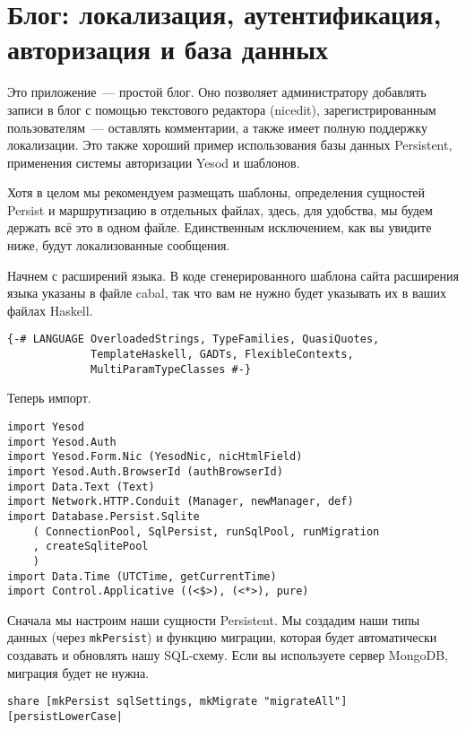 ﻿\chapter{Блог: локализация, аутентификация, авторизация и база данных}
\label{chap:blog}

Это приложение~--- простой блог. Оно позволяет администратору добавлять записи в блог с помощью текстового редактора (nicedit), зарегистрированным пользователям~--- оставлять комментарии, а также имеет полную поддержку локализации. Это также хороший пример использования базы данных Persistent, применения системы авторизации Yesod и шаблонов.

Хотя в целом мы рекомендуем размещать шаблоны, определения сущностей Persist и маршрутизацию в отдельных файлах, здесь, для удобства, мы будем держать всё это в одном файле. Единственным исключением, как вы увидите ниже, будут локализованные сообщения.

Начнем с расширений языка. В коде сгенерированного шаблона сайта расширения языка указаны в файле cabal, так что вам не нужно будет указывать их в ваших файлах Haskell.
 
\begin{lstlisting}
{-# LANGUAGE OverloadedStrings, TypeFamilies, QuasiQuotes,
             TemplateHaskell, GADTs, FlexibleContexts,
             MultiParamTypeClasses #-}
\end{lstlisting}
 
Теперь импорт. 

\begin{lstlisting} 
import Yesod
import Yesod.Auth
import Yesod.Form.Nic (YesodNic, nicHtmlField)
import Yesod.Auth.BrowserId (authBrowserId)
import Data.Text (Text)
import Network.HTTP.Conduit (Manager, newManager, def)
import Database.Persist.Sqlite
    ( ConnectionPool, SqlPersist, runSqlPool, runMigration
    , createSqlitePool
    )
import Data.Time (UTCTime, getCurrentTime)
import Control.Applicative ((<$>), (<*>), pure)
\end{lstlisting}%

Сначала мы настроим наши сущности Persistent. Мы создадим наши типы данных (через \lstinline!mkPersist!) и функцию миграции, которая будет автоматически создавать и обновлять нашу SQL-схему. Если вы используете сервер MongoDB, миграция будет не нужна.

\begin{lstlisting}
share [mkPersist sqlSettings, mkMigrate "migrateAll"] [persistLowerCase|
\end{lstlisting}
 

